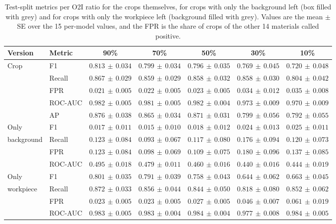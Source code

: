 \begin{table}[htbp]
\centering
\caption[Test split with only the background or only the workpiece left]{Test-split
metrics per O2I ratio for the crops themselves, for crops with only the background left
(box filled with grey) and for crops with only the workpiece left (background filled
with grey). Values are the mean $\pm$ SE over the 15 per-model values, and the FPR is
the share of crops of the other 14 materials called positive.}
\label{tab:removal}
\footnotesize
\setlength{\tabcolsep}{3pt}
\begin{tabular}{llccccc}
\toprule
Version & Metric & 90\% & 70\% & 50\% &
30\% & 10\% \\
\midrule
Crop      & F1      & $0.813\,{\pm}\,0.034$ & $0.799\,{\pm}\,0.034$ & $0.796\,{\pm}\,0.035$ & $0.769\,{\pm}\,0.045$ & $0.720\,{\pm}\,0.048$ \\
          & Recall  & $0.867\,{\pm}\,0.029$ & $0.859\,{\pm}\,0.029$ & $0.858\,{\pm}\,0.032$ & $0.858\,{\pm}\,0.030$ & $0.804\,{\pm}\,0.042$ \\
          & FPR     & $0.021\,{\pm}\,0.005$ & $0.022\,{\pm}\,0.005$ & $0.023\,{\pm}\,0.005$ & $0.034\,{\pm}\,0.012$ & $0.035\,{\pm}\,0.008$ \\
          & ROC-AUC & $0.982\,{\pm}\,0.005$ & $0.981\,{\pm}\,0.005$ & $0.982\,{\pm}\,0.004$ & $0.973\,{\pm}\,0.009$ & $0.970\,{\pm}\,0.009$ \\
          & AP      & $0.876\,{\pm}\,0.038$ & $0.865\,{\pm}\,0.034$ & $0.871\,{\pm}\,0.031$ & $0.799\,{\pm}\,0.056$ & $0.792\,{\pm}\,0.055$ \\
\midrule
Only      & F1      & $0.017\,{\pm}\,0.011$ & $0.015\,{\pm}\,0.010$ & $0.018\,{\pm}\,0.012$ & $0.024\,{\pm}\,0.013$ & $0.025\,{\pm}\,0.011$ \\
background & Recall & $0.123\,{\pm}\,0.084$ & $0.093\,{\pm}\,0.067$ & $0.117\,{\pm}\,0.080$ & $0.176\,{\pm}\,0.094$ & $0.120\,{\pm}\,0.073$ \\
          & FPR     & $0.123\,{\pm}\,0.084$ & $0.098\,{\pm}\,0.069$ & $0.109\,{\pm}\,0.075$ & $0.180\,{\pm}\,0.096$ & $0.137\,{\pm}\,0.085$ \\
          & ROC-AUC & $0.495\,{\pm}\,0.018$ & $0.479\,{\pm}\,0.011$ & $0.460\,{\pm}\,0.016$ & $0.440\,{\pm}\,0.016$ & $0.444\,{\pm}\,0.019$ \\
\midrule
Only      & F1      & $0.801\,{\pm}\,0.035$ & $0.791\,{\pm}\,0.039$ & $0.758\,{\pm}\,0.043$ & $0.644\,{\pm}\,0.062$ & $0.663\,{\pm}\,0.045$ \\
workpiece & Recall  & $0.872\,{\pm}\,0.033$ & $0.856\,{\pm}\,0.044$ & $0.844\,{\pm}\,0.050$ & $0.818\,{\pm}\,0.080$ & $0.852\,{\pm}\,0.062$ \\
          & FPR     & $0.023\,{\pm}\,0.005$ & $0.023\,{\pm}\,0.005$ & $0.027\,{\pm}\,0.005$ & $0.046\,{\pm}\,0.007$ & $0.061\,{\pm}\,0.019$ \\
          & ROC-AUC & $0.983\,{\pm}\,0.005$ & $0.983\,{\pm}\,0.004$ & $0.984\,{\pm}\,0.004$ & $0.977\,{\pm}\,0.008$ & $0.984\,{\pm}\,0.005$ \\
\bottomrule
\end{tabular}
\end{table}

